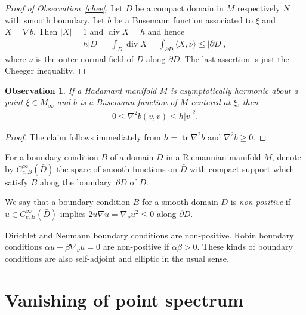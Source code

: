 \documentclass[11pt]{article}
\numberwithin{equation}{section}
\numberwithin{equation}{section}
\newtheorem{obs}[Theorem]{Observation}
 { \theoremstyle{definition}
\newtheorem{Definition}[Theorem]{Definition}
\newtheorem{Note}[Theorem]{Note}
\newtheorem{Example}[Theorem]{Example}
\newtheorem{Remark}[Theorem]{Remark}
\newtheorem{exas}[Theorem]{Examples}
\newtheorem{exa}[Theorem]{Example}}
\DeclareMathOperator{\diver}{div}
\DeclareMathOperator{\tr}{tr}
\begin{document}
\begin{proof}[Proof of Observation~\ref{chee}]
Let $D$ be a compact domain in $M$ respectively $N$ with smooth boundary.
Let $b$ be a Busemann function associated to $\xi$ and $X=\nabla b$.
Then $|X|=1$ and $\diver X=h$ and hence
\begin{align*}
	h|D| = \int_D\diver X = \int_{\partial D}\langle X,\nu\rangle \le |\partial D|,
\end{align*}
where $\nu$ is the outer normal field of $D$ along $\partial D$.
The last assertion is just the Cheeger in\-equality.
\end{proof}

\begin{obs}\label{obs}
If a Hadamard manifold $M$ is asymptotically harmonic about a point $\xi\in M_\infty$
and $b$ is a Busemann function of $M$ centered at $\xi$, then
\begin{align*}
	0 \le \nabla^2b(v,v) \le h |v|^2.
\end{align*}
\end{obs}

\begin{proof}
The claim follows immediately from $h=\tr\nabla^2b$ and $\nabla^2b\ge0$.
\end{proof}

\setcounter{Theorem}{3}
For a boundary condition $B$ of a domain $D$ in a Riemannian manifold $M$,
denote by $C^\infty_{c,B}(\bar{D})$ the space of smooth functions on $\bar D$ with compact support
which satisfy $B$ along the boundary~$\partial D$ of $D$.

\begin{Definition}%
We say that a boundary condition $B$ for a smooth domain $D$ is \emph{non-positive}
if~$u\in C^\infty_{c,B}(\bar D)$ implies $2u\nabla u=\nabla_\nu u^2\le0$ along $\partial D$.
\end{Definition}

\begin{exas}
Dirichlet and Neumann boundary conditions are non-positive.
Robin boundary conditions $\alpha u+\beta\nabla_\nu u=0$ are non-positive if $\alpha\beta>0$.
These kinds of boundary conditions are also self-adjoint and elliptic in the usual sense.
\end{exas}

\section{Vanishing of point spectrum}\label{secrell}
\end{document}
